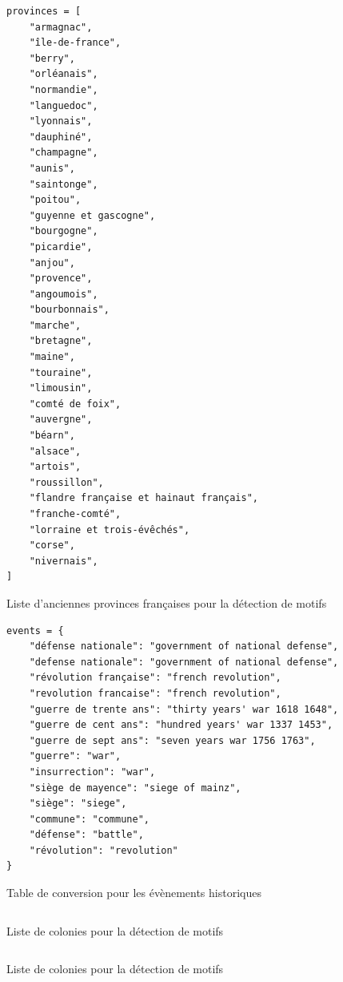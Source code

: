 \documentclass[a4paper, 12pt, twoside]{book}
\newenvironment{code}{\captionsetup{type=listing}}{}
\begin{document}
\begin{code}
	\begin{verbatim}
provinces = [
	"armagnac",
	"île-de-france",
	"berry",
	"orléanais",
	"normandie",
	"languedoc",
	"lyonnais",
	"dauphiné",
	"champagne",
	"aunis",
	"saintonge",
	"poitou",
	"guyenne et gascogne",
	"bourgogne",
	"picardie",
	"anjou",
	"provence",
	"angoumois",
	"bourbonnais",
	"marche",
	"bretagne",
	"maine",
	"touraine",
	"limousin",
	"comté de foix",
	"auvergne",
	"béarn",
	"alsace",
	"artois",
	"roussillon",
	"flandre française et hainaut français",
	"franche-comté",
	"lorraine et trois-évêchés",
	"corse",
	"nivernais",
]
	\end{verbatim}
	\label{appendix:convprov}
	\caption{Liste d'anciennes provinces françaises pour la détection de motifs}
\end{code}

\begin{code}
\begin{verbatim}
events = {
	"défense nationale": "government of national defense",
	"defense nationale": "government of national defense",
	"révolution française": "french revolution",
	"revolution francaise": "french revolution",
	"guerre de trente ans": "thirty years' war 1618 1648",
	"guerre de cent ans": "hundred years' war 1337 1453",
	"guerre de sept ans": "seven years war 1756 1763",
	"guerre": "war",
	"insurrection": "war",
	"siège de mayence": "siege of mainz",
	"siège": "siege",
	"commune": "commune",
	"défense": "battle",
	"révolution": "revolution"
}
\end{verbatim}
	\label{appendix:convevt}
	\caption{Table de conversion pour les évènements historiques}
\end{code}

\begin{code}
\begin{verbatim}
\end{verbatim}
\label{}
\caption{Liste de colonies pour la détection de motifs}
\end{code}

\begin{code}
\begin{verbatim}
\end{verbatim}
\label{}
\caption{Liste de colonies pour la détection de motifs}
\end{code}
	
	
	
	
	
	
	
	
	
	
\end{document}
